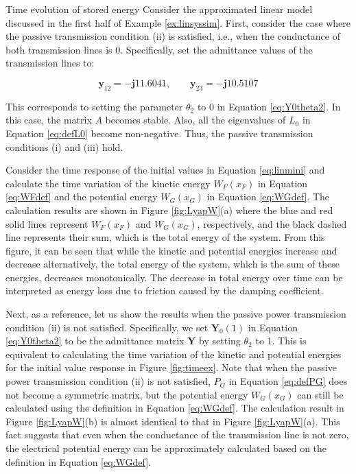 \documentclass[graybox, envcountchap]{svmult}
\begin{document}
\begin{example}{Time evolution of stored energy}\label{ex:energylin}
Consider the approximated linear model discussed in the first half of Example
\ref{ex:linsyssim}. First, consider the case where the passive transmission
condition (ii) is satisfied, i.e., when the conductance of both transmission
lines is 0. Specifically, set the admittance values of the transmission lines
to:

\begin{equation}\label{eq:bothlossless}
  \bm{y}_{12} = - \bm{j} 11.6041, \qquad
  \bm{y}_{23} =  - \bm{j} 10.5107
\end{equation}

This corresponds to setting the parameter $\theta_2$ to 0 in Equation
\ref{eq:Y0theta2}. In this case, the matrix $A$ becomes stable. Also, all the
eigenvalues of $L_0$ in Equation \ref{eq:defL0} become non-negative. Thus, the
passive transmission conditions (i) and (iii) hold.

Consider the time response of the initial values in Equation \ref{eq:linmini}
and calculate the time variation of the kinetic energy $W_F(x_F)$ in Equation
\ref{eq:WFdef} and the potential energy $W_G(x_G)$ in Equation \ref{eq:WGdef}.
The calculation results are shown in Figure \ref{fig:LyapW}(a) where the blue
and red solid lines represent $W_F(x_F)$ and $W_G(x_G)$, respectively, and the
black dashed line represents their sum, which is the total energy of the system.
From this figure, it can be seen that while the kinetic and potential energies
increase and decrease alternatively, the total energy of the system, which is
the sum of these energies, decreases monotonically. The decrease in total energy
over time can be interpreted as energy loss due to friction caused by the
damping coefficient.

Next, as a reference, let us show the results when the passive power
transmission condition (ii) is not satisfied. Specifically, we set $\bm{Y}_0(1)$
in Equation \ref{eq:Y0theta2} to be the admittance matrix $\bm{Y}$ by setting
$\theta_2$ to 1. This is equivalent to calculating the time variation of the
kinetic and potential energies for the initial value response in Figure
\ref{fig:timeex}. Note that when the passive power transmission condition (ii)
is not satisfied, $P_G$ in Equation \ref{eq:defPG} does not become a symmetric
matrix, but the potential energy $W_G(x_G)$ can still be calculated using the
definition in Equation \ref{eq:WGdef}. The calculation result in Figure
\ref{fig:LyapW}(b) is almost identical to that in Figure \ref{fig:LyapW}(a).
This fact suggests that even when the conductance of the transmission line is
not zero, the electrical potential energy can be approximately calculated based
on the definition in Equation \ref{eq:WGdef}.
\end{example}
\end{document}

